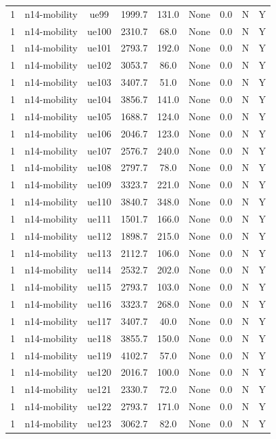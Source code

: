 \begin{table}[ht]
\begin{tabular}{|c|c|c|c|c|c|c|c|c|}
1 & n14-mobility & ue99 & 1999.7 & 131.0 & None & 0.0 & N & Y \\
1 & n14-mobility & ue100 & 2310.7 & 68.0 & None & 0.0 & N & Y \\
1 & n14-mobility & ue101 & 2793.7 & 192.0 & None & 0.0 & N & Y \\
1 & n14-mobility & ue102 & 3053.7 & 86.0 & None & 0.0 & N & Y \\
1 & n14-mobility & ue103 & 3407.7 & 51.0 & None & 0.0 & N & Y \\
1 & n14-mobility & ue104 & 3856.7 & 141.0 & None & 0.0 & N & Y \\
1 & n14-mobility & ue105 & 1688.7 & 124.0 & None & 0.0 & N & Y \\
1 & n14-mobility & ue106 & 2046.7 & 123.0 & None & 0.0 & N & Y \\
1 & n14-mobility & ue107 & 2576.7 & 240.0 & None & 0.0 & N & Y \\
1 & n14-mobility & ue108 & 2797.7 & 78.0 & None & 0.0 & N & Y \\
1 & n14-mobility & ue109 & 3323.7 & 221.0 & None & 0.0 & N & Y \\
1 & n14-mobility & ue110 & 3840.7 & 348.0 & None & 0.0 & N & Y \\
1 & n14-mobility & ue111 & 1501.7 & 166.0 & None & 0.0 & N & Y \\
1 & n14-mobility & ue112 & 1898.7 & 215.0 & None & 0.0 & N & Y \\
1 & n14-mobility & ue113 & 2112.7 & 106.0 & None & 0.0 & N & Y \\
1 & n14-mobility & ue114 & 2532.7 & 202.0 & None & 0.0 & N & Y \\
1 & n14-mobility & ue115 & 2793.7 & 103.0 & None & 0.0 & N & Y \\
1 & n14-mobility & ue116 & 3323.7 & 268.0 & None & 0.0 & N & Y \\
1 & n14-mobility & ue117 & 3407.7 & 40.0 & None & 0.0 & N & Y \\
1 & n14-mobility & ue118 & 3855.7 & 150.0 & None & 0.0 & N & Y \\
1 & n14-mobility & ue119 & 4102.7 & 57.0 & None & 0.0 & N & Y \\
1 & n14-mobility & ue120 & 2016.7 & 100.0 & None & 0.0 & N & Y \\
1 & n14-mobility & ue121 & 2330.7 & 72.0 & None & 0.0 & N & Y \\
1 & n14-mobility & ue122 & 2793.7 & 171.0 & None & 0.0 & N & Y \\
1 & n14-mobility & ue123 & 3062.7 & 82.0 & None & 0.0 & N & Y \\

\end{tabular}
\end{table}
